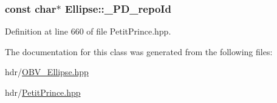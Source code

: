 \subsubsection[{\texorpdfstring{\+\_\+\+P\+D\+\_\+repo\+Id}{_PD_repoId}}]{ const char$\ast$ Ellipse\+::\+\_\+\+P\+D\+\_\+repo\+Id\hspace{0.3cm}{\ttfamily [static]}}\hypertarget{class_ellipse_a9d889330622bef63cd90c0f42e7ee344}{}\label{class_ellipse_a9d889330622bef63cd90c0f42e7ee344}


Definition at line 660 of file Petit\+Prince.\+hpp.



The documentation for this class was generated from the following files\+:\begin{DoxyCompactItemize}
\item 
hdr/\hyperlink{_o_b_v___ellipse_8hpp}{O\+B\+V\+\_\+\+Ellipse.\+hpp}\item 
hdr/\hyperlink{_petit_prince_8hpp}{Petit\+Prince.\+hpp}\end{DoxyCompactItemize}
